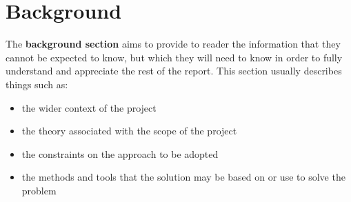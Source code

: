 
\chapter{Background}\label{ch:background}

The \textbf{background section} aims to provide to reader the
information that they cannot be expected to know, but which they will
need to know in order to fully understand and appreciate the rest of the
report. This section usually describes things such as:

\begin{itemize}
  \item the wider context of the project
  \item the theory associated with the scope of the project
  \item the constraints on the approach to be adopted
  \item the methods and tools that the solution may be based on or use to solve the problem
\end{itemize}
